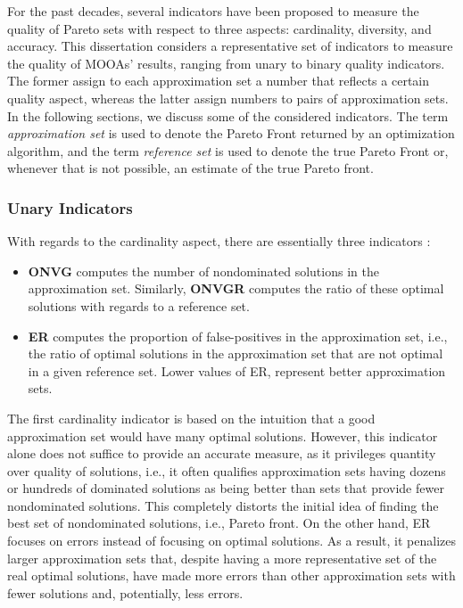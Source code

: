 	For the past decades, several indicators have been proposed to measure the quality of Pareto sets with respect to three aspects: cardinality, diversity, and accuracy. This dissertation considers a representative set of indicators to measure the quality of \acp{MOOA}' results, ranging from unary to binary quality indicators. The former assign to each approximation set a number that reflects a certain quality aspect, whereas the latter assign numbers to pairs of approximation sets. In the following sections, we discuss some of the considered indicators. The term \textit{approximation set} is used to denote the Pareto Front returned by an optimization algorithm, and the term \textit{reference set} is used to denote the true Pareto Front or, whenever that is not possible, an estimate of the true Pareto front. 	
	
	\subsubsection{Unary Indicators}
	With regards to the cardinality aspect, there are essentially three indicators \cite{Veldhuizen1999GD}:
	\begin{itemize}
		\item \textbf{\ac{ONVG}} computes the number of nondominated solutions in the approximation set. Similarly, \textbf{\ac{ONVGR}} computes the ratio of these optimal solutions with regards to a reference set.
		\item \textbf{\ac{ER}} computes the proportion of false-positives in the approximation set, i.e., the ratio of optimal solutions in the approximation set that are not optimal in a given reference set. Lower values of \ac{ER}, represent better approximation sets. 		
	\end{itemize}
	
	The first cardinality indicator is based on the intuition that a good approximation set would have many optimal solutions. However, this indicator alone does not suffice to provide an accurate measure, as it privileges quantity over quality of solutions, i.e., it often qualifies approximation sets having dozens or hundreds of dominated solutions as being better than sets that provide fewer nondominated solutions. This completely distorts the initial idea of finding the best set of nondominated solutions, i.e., Pareto front. On the other hand, \ac{ER} focuses on errors instead of focusing on optimal solutions. As a result, it penalizes larger approximation sets that, despite having a more representative set of the real optimal solutions, have made more errors than other approximation sets with fewer solutions and, potentially, less errors. 
	
